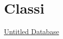 \section{Classi}\label{classi}

\href{Untitled\%20Database\%206bc5f913788d415e9a5c1447b11fb53e.csv}{Untitled
Database}
